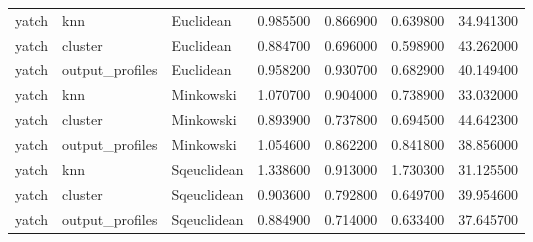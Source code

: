 \begin{tabular}{lllrrrr}
yatch & knn & Euclidean & 0.985500 & 0.866900 & 0.639800 & 34.941300 \\
yatch & cluster & Euclidean & 0.884700 & 0.696000 & 0.598900 & 43.262000 \\
yatch & output\_profiles & Euclidean & 0.958200 & 0.930700 & 0.682900 & 40.149400 \\
yatch & knn & Minkowski & 1.070700 & 0.904000 & 0.738900 & 33.032000 \\
yatch & cluster & Minkowski & 0.893900 & 0.737800 & 0.694500 & 44.642300 \\
yatch & output\_profiles & Minkowski & 1.054600 & 0.862200 & 0.841800 & 38.856000 \\
yatch & knn & Sqeuclidean & 1.338600 & 0.913000 & 1.730300 & 31.125500 \\
yatch & cluster & Sqeuclidean & 0.903600 & 0.792800 & 0.649700 & 39.954600 \\
yatch & output\_profiles & Sqeuclidean & 0.884900 & 0.714000 & 0.633400 & 37.645700 \\
\bottomrule
\end{tabular}
